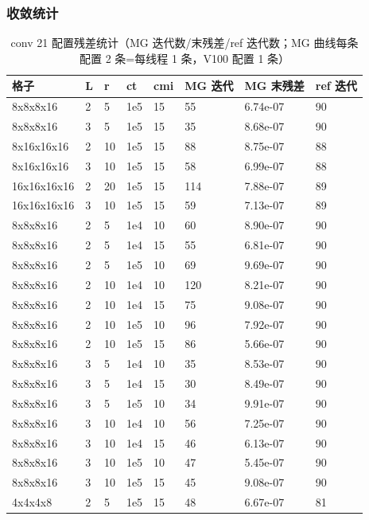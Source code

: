 \documentclass[UTF8]{ctexart}
\begin{document}
\subsubsection{收敛统计}
\begin{table}[htbp]\centering
\small
\begin{tabular}{llllllll}
\toprule
格子 & L & r & ct & cmi & MG 迭代 & MG 末残差 & ref 迭代 \\
\midrule
8x8x8x16 & 2 & 5 & 1e5 & 15 & 55 & 6.74e-07 & 90 \\
8x8x8x16 & 3 & 5 & 1e5 & 15 & 35 & 8.68e-07 & 90 \\
8x16x16x16 & 2 & 10 & 1e5 & 15 & 88 & 8.75e-07 & 88 \\
8x16x16x16 & 3 & 10 & 1e5 & 15 & 58 & 6.99e-07 & 88 \\
16x16x16x16 & 2 & 20 & 1e5 & 15 & 114 & 7.88e-07 & 89 \\
16x16x16x16 & 3 & 10 & 1e5 & 15 & 59 & 7.13e-07 & 89 \\
8x8x8x16 & 2 & 5 & 1e4 & 10 & 60 & 8.90e-07 & 90 \\
8x8x8x16 & 2 & 5 & 1e4 & 15 & 55 & 6.81e-07 & 90 \\
8x8x8x16 & 2 & 5 & 1e5 & 10 & 69 & 9.69e-07 & 90 \\
8x8x8x16 & 2 & 10 & 1e4 & 10 & 120 & 8.21e-07 & 90 \\
8x8x8x16 & 2 & 10 & 1e4 & 15 & 75 & 9.08e-07 & 90 \\
8x8x8x16 & 2 & 10 & 1e5 & 10 & 96 & 7.92e-07 & 90 \\
8x8x8x16 & 2 & 10 & 1e5 & 15 & 86 & 5.66e-07 & 90 \\
8x8x8x16 & 3 & 5 & 1e4 & 10 & 35 & 8.53e-07 & 90 \\
8x8x8x16 & 3 & 5 & 1e4 & 15 & 30 & 8.49e-07 & 90 \\
8x8x8x16 & 3 & 5 & 1e5 & 10 & 34 & 9.91e-07 & 90 \\
8x8x8x16 & 3 & 10 & 1e4 & 10 & 56 & 7.25e-07 & 90 \\
8x8x8x16 & 3 & 10 & 1e4 & 15 & 46 & 6.13e-07 & 90 \\
8x8x8x16 & 3 & 10 & 1e5 & 10 & 47 & 5.45e-07 & 90 \\
8x8x8x16 & 3 & 10 & 1e5 & 15 & 45 & 9.08e-07 & 90 \\
4x4x4x8 & 2 & 5 & 1e5 & 15 & 48 & 6.67e-07 & 81 \\
\bottomrule
\end{tabular}
\caption{conv 21 配置残差统计（MG 迭代数/末残差/ref 迭代数；MG 曲线每条
配置 2 条=每线程 1 条，V100 配置 1 条）}
\end{table}
\end{document}
